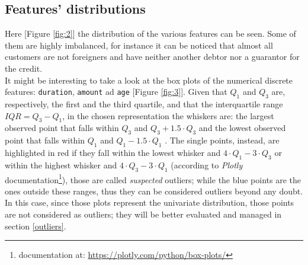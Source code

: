 \documentclass[letterpaper]{article}
\begin{document}
	\subsection{Features' distributions} \label{features distrubution}
	Here [Figure \ref{fig:2}] the distribution of the various features can be seen. Some of them are highly imbalanced, for instance it can be noticed that almost all customers are not foreigners and have neither another debtor nor a guarantor for the credit. \\
	It might be interesting to take a look at the box plots of the numerical discrete features: \texttt{duration}, \texttt{amount} ad \texttt{age}  [Figure \ref{fig:3}]. Given that $Q_1$ and $Q_3$ are, respectively, the first and the third quartile, and that the interquartile range $IQR = Q_3 - Q_1$, in the chosen representation the whiskers are: the largest observed point that falls within $Q_3$ and $Q_3 + 1.5\cdot Q_3$ and the lowest observed point that falls within $Q_1$ and $Q_1 - 1.5\cdot Q_1$ \cite{boxplots_wiki}. The single points, instead, are highlighted in red if they fall within the lowest whisker and $4\cdot Q_1 - 3\cdot Q_3$ or within the highest whisker and  $4\cdot Q_3 - 3\cdot Q_1$ (according to \emph{Plotly} documentation\footnote{documentation at: \url{https://plotly.com/python/box-plots/}}), those are called \emph{suspected} outliers; while the blue points are the ones outside these ranges, thus they can be considered outliers beyond any doubt. \\
	In this case, since those plots represent the univariate distribution, those points are not considered as outliers; they will be better evaluated and managed in section \ref{outliers}.
\end{document}
